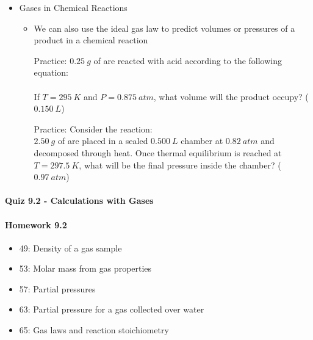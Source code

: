 \documentclass[12pt, openany, letterpaper]{memoir}
\begin{document}
\begin{itemize}
\begin{itemize}
    \end{itemize}
  \item Gases in Chemical Reactions
    \begin{itemize}
      \item We can also use the ideal gas law to predict volumes or pressures of a product in a chemical reaction

            Practice: $0.25~g$ of  are reacted with acid according to the following equation:\\
            \\
            If $T=295~K$ and $P=0.875~atm$, what volume will the  product occupy? ($0.150~L$)

            Practice: Consider the reaction: \\
            $2.50~g$ of  are placed in a sealed $0.500~L$ chamber at $0.82~atm$ and decomposed through heat. Once thermal equilibrium is reached at $T=297.5~K$, what will be the final pressure inside the chamber? ($0.97~atm$)
    \end{itemize}
\end{itemize}

\paragraph*{Quiz 9.2 - Calculations with Gases}
\paragraph*{Homework 9.2}
\begin{itemize}
  \item 49: Density of a gas sample
  \item 53: Molar mass from gas properties
  \item 57: Partial pressures
  \item 63: Partial pressure for a gas collected over water
  \item 65: Gas laws and reaction stoichiometry
\end{itemize}
\end{document}
